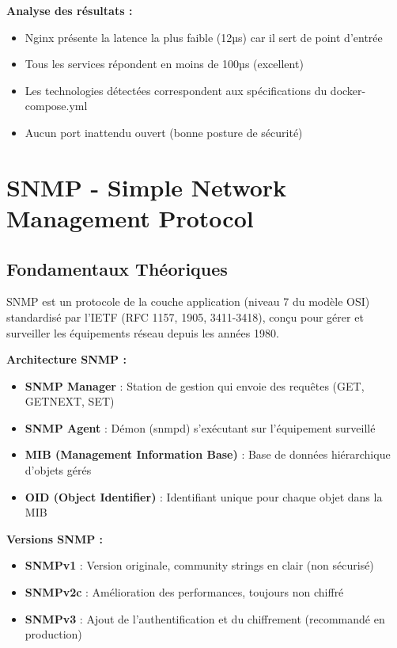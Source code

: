 \documentclass[11pt,a4paper]{report}
\begin{document}
\textbf{Analyse des résultats :}
\begin{itemize}
    \item Nginx présente la latence la plus faible (12µs) car il sert de point d'entrée
    \item Tous les services répondent en moins de 100µs (excellent)
    \item Les technologies détectées correspondent aux spécifications du docker-compose.yml
    \item Aucun port inattendu ouvert (bonne posture de sécurité)
\end{itemize}

\section{SNMP - Simple Network Management Protocol}

\subsection{Fondamentaux Théoriques}

SNMP est un protocole de la couche application (niveau 7 du modèle OSI) standardisé par l'IETF (RFC 1157, 1905, 3411-3418), conçu pour gérer et surveiller les équipements réseau depuis les années 1980.

\textbf{Architecture SNMP :}
\begin{itemize}
    \item \textbf{SNMP Manager} : Station de gestion qui envoie des requêtes (GET, GETNEXT, SET)
    \item \textbf{SNMP Agent} : Démon (snmpd) s'exécutant sur l'équipement surveillé
    \item \textbf{MIB (Management Information Base)} : Base de données hiérarchique d'objets gérés
    \item \textbf{OID (Object Identifier)} : Identifiant unique pour chaque objet dans la MIB
\end{itemize}

\textbf{Versions SNMP :}
\begin{itemize}
    \item \textbf{SNMPv1} : Version originale, community strings en clair (non sécurisé)
    \item \textbf{SNMPv2c} : Amélioration des performances, toujours non chiffré
    \item \textbf{SNMPv3} : Ajout de l'authentification et du chiffrement (recommandé en production)
\end{itemize}
\end{document}
